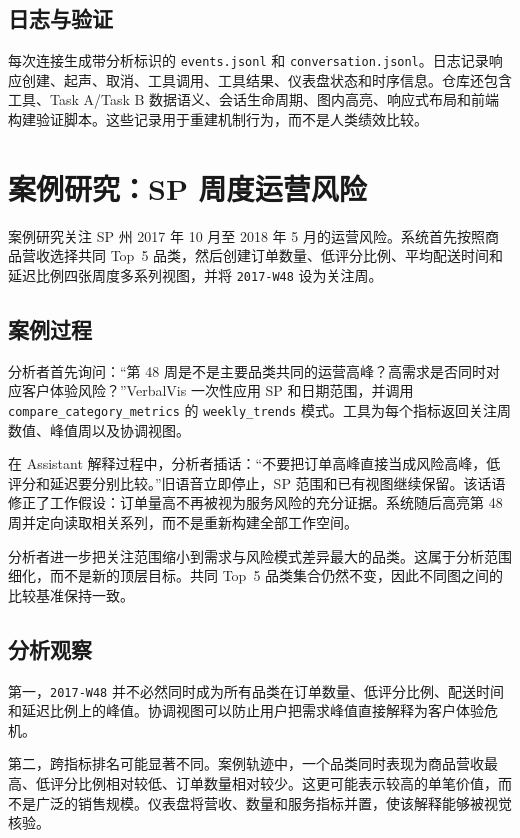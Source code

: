 \documentclass[UTF8,a4paper,10.5pt]{ctexart}
\begin{document}
\subsection{日志与验证}

每次连接生成带分析标识的 \texttt{events.jsonl} 和 \texttt{conversation.jsonl}。日志记录响应创建、起声、取消、工具调用、工具结果、仪表盘状态和时序信息。仓库还包含工具、Task A/Task B 数据语义、会话生命周期、图内高亮、响应式布局和前端构建验证脚本。这些记录用于重建机制行为，而不是人类绩效比较。

\section{案例研究：SP 周度运营风险}

案例研究关注 SP 州 2017 年 10 月至 2018 年 5 月的运营风险。系统首先按照商品营收选择共同 Top~5 品类，然后创建订单数量、低评分比例、平均配送时间和延迟比例四张周度多系列视图，并将 \texttt{2017-W48} 设为关注周。

\subsection{案例过程}

分析者首先询问：“第 48 周是不是主要品类共同的运营高峰？高需求是否同时对应客户体验风险？”VerbalVis 一次性应用 SP 和日期范围，并调用 \texttt{compare\_category\_metrics} 的 \texttt{weekly\_trends} 模式。工具为每个指标返回关注周数值、峰值周以及协调视图。

在 Assistant 解释过程中，分析者插话：“不要把订单高峰直接当成风险高峰，低评分和延迟要分别比较。”旧语音立即停止，SP 范围和已有视图继续保留。该话语修正了工作假设：订单量高不再被视为服务风险的充分证据。系统随后高亮第 48 周并定向读取相关系列，而不是重新构建全部工作空间。

分析者进一步把关注范围缩小到需求与风险模式差异最大的品类。这属于分析范围细化，而不是新的顶层目标。共同 Top~5 品类集合仍然不变，因此不同图之间的比较基准保持一致。

\subsection{分析观察}

第一，\texttt{2017-W48} 并不必然同时成为所有品类在订单数量、低评分比例、配送时间和延迟比例上的峰值。协调视图可以防止用户把需求峰值直接解释为客户体验危机。

第二，跨指标排名可能显著不同。案例轨迹中，一个品类同时表现为商品营收最高、低评分比例相对较低、订单数量相对较少。这更可能表示较高的单笔价值，而不是广泛的销售规模。仪表盘将营收、数量和服务指标并置，使该解释能够被视觉核验。
\end{document}
